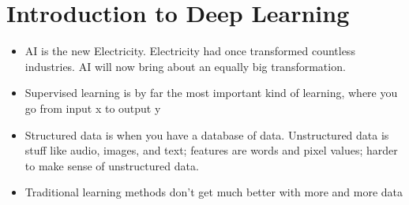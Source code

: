 \section{Introduction to Deep Learning}

\begin{itemize}[wide, labelwidth=!, labelindent=0pt]
\itemsep0em 
    \item AI is the new Electricity. Electricity had once transformed
countless industries. AI will now bring about an equally
big transformation.
    \item Supervised learning is by far the most important kind of learning, where you go from input x to output y
    \item Structured data is when you have a database of data. Unstructured data is stuff like audio, images, and text; features are words and pixel values; harder to make sense of unstructured data.
    \item Traditional learning methods don't get much better with more and more data \vspace*{-\baselineskip}
\end{itemize}